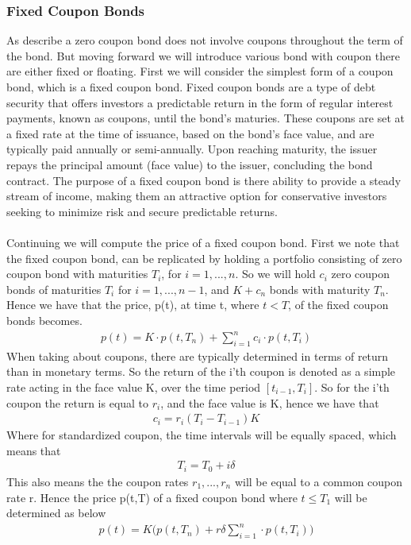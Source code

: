 \subsubsection{Fixed Coupon Bonds}
As describe a zero coupon bond does not involve coupons throughout the term of the bond. 
But moving forward we will introduce various bond with coupon there are either fixed 
or floating. First we will consider the simplest form of a coupon bond, which is a 
fixed coupon bond. Fixed coupon bonds are a type of debt security that offers investors a predictable
return in the form of regular interest payments, known as coupons, until the bond's maturies.
These coupons are set at a fixed rate at the time of issuance, based on the bond's face value,
and are typically paid annually or semi-annually. Upon reaching maturity, the issuer repays 
the principal amount (face value) to the issuer, concluding the bond contract. The purpose
of a fixed coupon bond is there ability to provide a steady stream of income,
making them an attractive option for conservative investors seeking to minimize risk and 
secure predictable returns.
\\\\
Continuing we will compute the price of a fixed coupon bond. First we note that the fixed coupon bond,
can be replicated by holding a portfolio consisting of zero coupon bond with maturities $T_i$, for 
$i=1,...,n$. So we will hold $c_i$ zero coupon bonds of maturities $T_i$ for $i=1,...,n-1$, and 
$K+c_n$ bonds with maturity $T_n$. Hence we have that the price, p(t), at time t, where $t<T$, of 
the fixed coupon bonds becomes. \cite{Bjork}
\begin{align*}
    p(t) = K \cdot p(t,T_n) + \sum_{i=1}^{n}c_i \cdot p(t,T_i)
\end{align*}
When taking about coupons, there are typically determined in terms of return than in monetary terms.
So the return of the i'th coupon is denoted as a simple rate acting in the face value K, over the
time period $[t_{i-1},T_i]$. So for the i'th coupon the return is equal to $r_i$, and the face value 
is K, hence we have that 
\begin{align*}
    c_i = r_i(T_i-T_{i-1})K
\end{align*}
Where for standardized coupon, the time intervals will be equally spaced, which means that 
\begin{align*}
    T_i = T_0 + i \delta
\end{align*}
This also means the the coupon rates $r_1,...,r_n$ will be equal to a common coupon rate r. 
Hence the price p(t,T) of a fixed coupon bond where $t \leq T_1$ will be determined as below \cite{Bjork}
\begin{align*}
    p(t)= K \Big( p(t,T_n)+ r \delta \sum_{i=1}^{n}\cdot p(t,T_i) \Big)
\end{align*}
